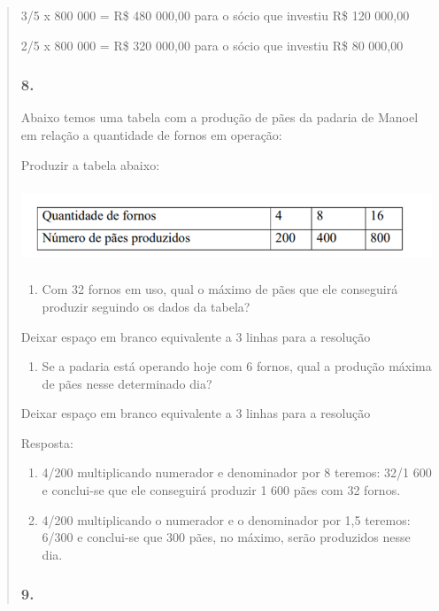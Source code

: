 \begin{enumerate}
\begin{escolha}
\begin{enumerate}
\begin{itemize}
\begin{itemize}
\begin{escolha}
\begin{quote}
\begin{escolha}
{3/5 x 800 000 = R\$ 480 000,00 para o sócio que investiu R\$ 120 000,00

2/5 x 800 000 = R\$ 320 000,00 para o sócio que investiu R\$ 80 000,00

\subsubsection{8.}\label{section-124}

Abaixo temos uma tabela com a produção de pães da padaria de Manoel em
relação a quantidade de fornos em operação:

Produzir a tabela abaixo:

\includegraphics[width=5.90556in,height=0.92222in]{media/image131.png}

\begin{enumerate}
\def\labelenumi{\alph{enumi})}
\item
  Com 32 fornos em uso, qual o máximo de pães que ele conseguirá
  produzir seguindo os dados da tabela?
\end{enumerate}

Deixar espaço em branco equivalente a 3 linhas para a resolução

\begin{enumerate}
\def\labelenumi{\alph{enumi})}
\item
  Se a padaria está operando hoje com 6 fornos, qual a produção máxima
  de pães nesse determinado dia?
\end{enumerate}

Deixar espaço em branco equivalente a 3 linhas para a resolução

Resposta:

\begin{enumerate}
\def\labelenumi{\alph{enumi})}
\item
  4/200 multiplicando numerador e denominador por 8 teremos: 32/1 600 e
  conclui-se que ele conseguirá produzir 1 600 pães com 32 fornos.
\item
  4/200 multiplicando o numerador e o denominador por 1,5 teremos: 6/300
  e conclui-se que 300 pães, no máximo, serão produzidos nesse dia.
\end{enumerate}

\subsubsection{9.}\label{section-125}

}
\end{escolha}
\end{quote}
\end{escolha}
\end{itemize}
\end{itemize}
\end{enumerate}
\end{escolha}
\end{enumerate}
